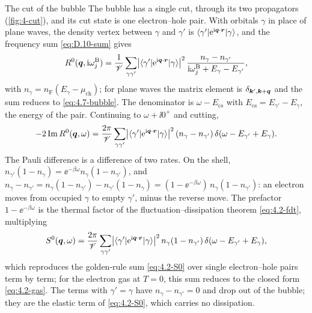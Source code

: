 \begin{workedexample}{The cut of the bubble}\label{we:4-cut}
The bubble has a single cut, through its two propagators (\cref{fig:4-cut}), and its cut state is one electron--hole pair. With orbitals $\gamma$ in place of plane waves, the density vertex between $\gamma$ and $\gamma'$ is $\langle\gamma'|\mathrm{e}^{\mathrm{i}\bm{q}\cdot\bm{r}}|\gamma\rangle$, and the frequency sum \cref{eq:D.10-sum} gives
\begin{equation*}
  R^0(\bm{q},\mathrm{i}\omega^{\mathrm{B}}_j) = \frac1{\mathscr{V}}\sum_{\gamma\gamma'}\bigl|\langle\gamma'|\mathrm{e}^{\mathrm{i}\bm{q}\cdot\bm{r}}|\gamma\rangle\bigr|^2\,\frac{n_\gamma - n_{\gamma'}}{\mathrm{i}\omega^{\mathrm{B}}_j + E_\gamma - E_{\gamma'}} ,
\end{equation*}
with $n_\gamma = n_{\mathrm{F}}(E_\gamma - \mu_{\mathrm{ch}})$; for plane waves the matrix element is $\delta_{\bm{k}',\bm{k}+\bm{q}}$ and the sum reduces to \cref{eq:4.7-bubble}. The denominator is $\omega - E_{\mathrm{cs}}$ with $E_{\mathrm{cs}} = E_{\gamma'} - E_\gamma$, the energy of the pair. Continuing to $\omega + \ii0^+$ and cutting,
\begin{equation*}
  -2\operatorname{Im} R^0(\bm{q},\omega) = \frac{2\pi}{\mathscr{V}}\sum_{\gamma\gamma'}\bigl|\langle\gamma'|\mathrm{e}^{\mathrm{i}\bm{q}\cdot\bm{r}}|\gamma\rangle\bigr|^2\,(n_\gamma - n_{\gamma'})\,\delta(\omega - E_{\gamma'} + E_\gamma) .
\end{equation*}
The Pauli difference is a difference of two rates. On the shell, $n_{\gamma'}(1 - n_\gamma) = \ee^{-\beta\omega}n_\gamma(1 - n_{\gamma'})$, and $n_\gamma - n_{\gamma'} = n_\gamma(1 - n_{\gamma'}) - n_{\gamma'}(1 - n_\gamma) = (1 - \ee^{-\beta\omega})\,n_\gamma(1 - n_{\gamma'})$: an electron moves from occupied $\gamma$ to empty $\gamma'$, minus the reverse move. The prefactor $1 - \ee^{-\beta\omega}$ is the thermal factor of the fluctuation--dissipation theorem \cref{eq:4.2-fdt}, multiplying
\begin{equation*}
  S^0(\bm{q},\omega) = \frac{2\pi}{\mathscr{V}}\sum_{\gamma\gamma'}\bigl|\langle\gamma'|\mathrm{e}^{\mathrm{i}\bm{q}\cdot\bm{r}}|\gamma\rangle\bigr|^2\,n_\gamma(1 - n_{\gamma'})\,\delta(\omega - E_{\gamma'} + E_\gamma) ,
\end{equation*}
which reproduces the golden-rule sum \cref{eq:4.2-S0} over single electron--hole pairs term by term; for the electron gas at $T = 0$, this sum reduces to the closed form \cref{eq:4.2-gas}. The terms with $\gamma' = \gamma$ have $n_\gamma - n_{\gamma'} = 0$ and drop out of the bubble; they are the elastic term of \cref{eq:4.2-S0}, which carries no dissipation.
\end{workedexample}

